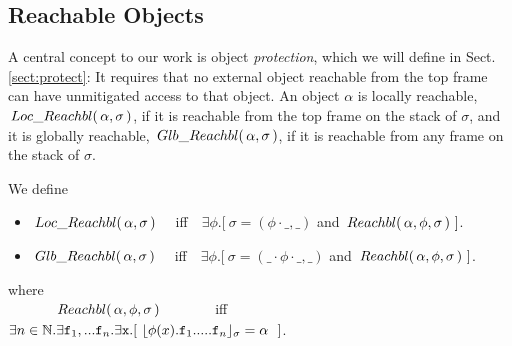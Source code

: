    
  \subsection{{Reachable  Objects}}

 {A central concept to our work is object \emph{protection}, which we will define in   Sect. \ref{sect:protect}: It requires that no external object  
reachable from the top frame  can have unmitigated access to that object.}
%
%
An object $\alpha$ is  locally reachable, $ \,Loc\_Reachbl(\,\alpha,\sigma\,) $, if it is reachable from the top frame on the stack of $\sigma$,
and it is globally reachable, $\,Glb\_Reachbl(\,\alpha,\sigma\,)$, if it is reachable from any  frame on the stack of $\sigma$.
 
\begin{definition} We define 
\begin{itemize}
\item
$ \,Loc\_Reachbl(\,\alpha,\sigma\,) $ \ \ iff\ \  
$\exists \phi.[\ \sigma=(\phi\cdot\_, \_)$ and $\Relevant \alpha \phi \sigma\ ]$. %
\item
$\,Glb\_Reachbl(\,\alpha,\sigma\,)$  \ \ iff\ \  
$\exists \phi.[\ \sigma=(\_\cdot\phi\cdot\_, \_)$ and $\Relevant \alpha \phi \sigma\ ]$. %
\end{itemize}
where\\
$\strut\ \ \ \  \ \ \ \ \ \ \,Reachbl(\,\alpha,\phi,\sigma\,) $  \ \ \ \ \ \ \ iff\ \  
$\exists n\in \mathbb{N}.\exists \prg{f}_1,... \prg{f}_n.\exists \prg{x}.[ \ \interpret{\sigma}{\phi(x).\prg{f}_1.....\prg{f}_n} = \alpha \ \ ]$.

\end{definition}

